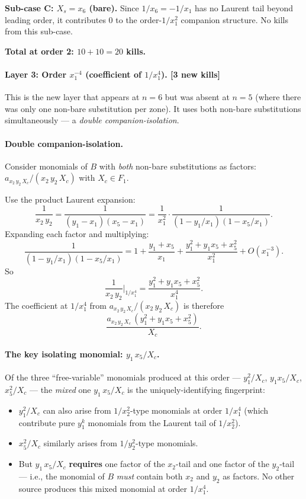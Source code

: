 \documentclass[11pt]{article}
\theoremstyle{definition}
\begin{document}
\textbf{Sub-case C: $X_s=x_6$ (bare).} Since $1/x_6=-1/x_1$ has no Laurent
tail beyond leading order, it contributes $0$ to the order-$1/x_1^2$
companion structure. No kills from this sub-case.

\textbf{Total at order 2: $10+10=20$ kills.}

\paragraph{Layer 3: Order $x_1^{-4}$ (coefficient of $1/x_1^4$). [\textbf{3 new kills}]}

This is the new layer that appears at $n=6$ but was absent at $n=5$ (where
there was only one non-bare substitution per zone). It uses both non-bare
substitutions simultaneously --- a \emph{double companion-isolation}.

\paragraph{Double companion-isolation.} Consider monomials of $B$ with
\emph{both} non-bare substitutions as factors: $a_{x_2\,y_2\,X_c}/(x_2\,y_2\,X_c)$
with $X_c\in F_1$.

Use the product Laurent expansion:
\[
\frac{1}{x_2\,y_2}=\frac{1}{(y_1-x_1)(x_5-x_1)}=\frac{1}{x_1^2}\cdot\frac{1}{(1-y_1/x_1)(1-x_5/x_1)}.
\]
Expanding each factor and multiplying:
\[
\frac{1}{(1-y_1/x_1)(1-x_5/x_1)}
= 1 + \frac{y_1+x_5}{x_1} + \frac{y_1^2+y_1 x_5+x_5^2}{x_1^2} + O(x_1^{-3}).
\]
So
\[
\frac{1}{x_2\,y_2}\bigg|_{1/x_1^4} = \frac{y_1^2+y_1 x_5+x_5^2}{x_1^4}.
\]
The coefficient at $1/x_1^4$ from $a_{x_2\,y_2\,X_c}/(x_2\,y_2\,X_c)$ is therefore
\[
\frac{a_{x_2\,y_2\,X_c}\,(y_1^2+y_1 x_5+x_5^2)}{X_c}.
\]

\paragraph{The key isolating monomial: $y_1\,x_5/X_c$.} Of the three
``free-variable'' monomials produced at this order --- $y_1^2/X_c$,
$y_1 x_5/X_c$, $x_5^2/X_c$ --- the \emph{mixed} one $y_1\,x_5/X_c$
is the uniquely-identifying fingerprint:
\begin{itemize}[nosep,leftmargin=2em]
\item $y_1^2/X_c$ can also arise from $1/x_2^2$-type monomials at order $1/x_1^4$
(which contribute pure $y_1^k$ monomials from the Laurent tail of $1/x_2^2$).
\item $x_5^2/X_c$ similarly arises from $1/y_2^2$-type monomials.
\item But $y_1\,x_5/X_c$ \textbf{requires} one factor of the $x_2$-tail
and one factor of the $y_2$-tail --- i.e., the monomial of $B$ \emph{must}
contain both $x_2$ and $y_2$ as factors. No other source produces this
mixed monomial at order $1/x_1^4$.
\end{itemize}
\end{document}
